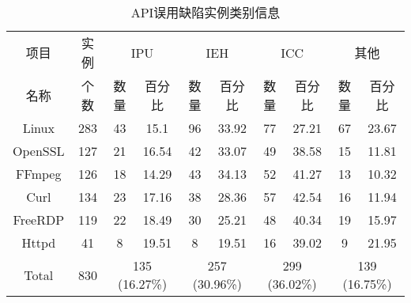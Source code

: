 \begin{table}[b]
	\centering
	\begin{minipage}[t]{\linewidth} %
		\caption{API误用缺陷实例类别信息}
		\label{tab:2-3-root-causes}
		\begin{tabular}{@{\extracolsep{3pt}}cccccccccc@{}}
			\hline
			项目 & 实例 & \multicolumn{2}{c}{IPU}& \multicolumn{2}{c}{IEH}& \multicolumn{2}{c}{ICC}& \multicolumn{2}{c}{其他}\\
			\cline{3-4} \cline{5-6} \cline{7-8} \cline{9-10}
		    名称	& 个数 & 数量 & 百分比 & 数量& 百分比 & 数量& 百分比& 数量& 百分比 \\
			\hline
			Linux  & 283 & 43 & 15.1 & {96} & {33.92} & 77 & 27.21 & 67 & 23.67 \\
			OpenSSL  & 127 & 21 & 16.54 & 42 & 33.07 & {49} & {38.58} & 15 & 11.81 \\ 
			FFmpeg  & 126  &  18 & 14.29 & 43 & 34.13 & 52 & 41.27 & 13 & 10.32 \\
			Curl  & 134   & 23 & 17.16 & 38 & 28.36 & 57 & 42.54 & 16 & 11.94 \\ 
			FreeRDP   & 119 & 22 & 18.49 & 30 & 25.21 & 48 & 40.34 & 19 & 15.97 \\ 
			Httpd  & 41 & 8 & 19.51 & 8 & 19.51 & 16 & 39.02 & 9 & 21.95 \\ 
			\hline
			Total  & 830 & \multicolumn{2}{c}{135 (16.27\%)} & \multicolumn{2}{c}{257 (30.96\%)} & \multicolumn{2}{c}{299 (36.02\%)} & \multicolumn{2}{c}{139 (16.75\%)}\\ 
			\hline
		\end{tabular}
	\end{minipage}
\end{table}